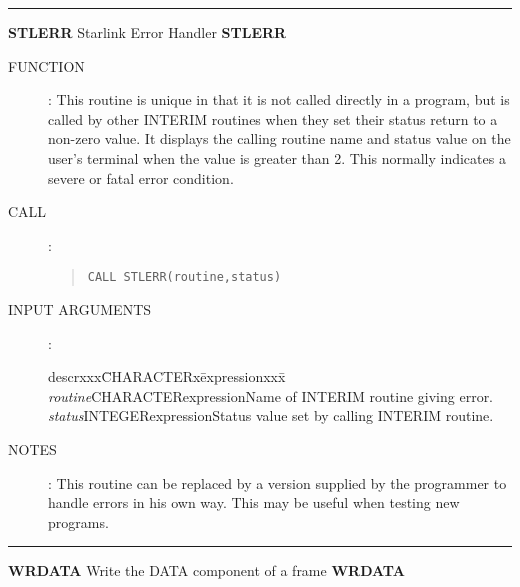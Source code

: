\documentclass{article}
\begin{document}
\rule{\textwidth}{0.3mm}
{\Large {\bf STLERR} \hfill Starlink Error Handler \hfill {\bf STLERR}}
\begin{description}
\item [FUNCTION]:
This routine is unique in that it is not called directly in a program, but is
called by other INTERIM routines when they set their status return to a
non-zero value.
It displays the calling routine name and status value on the user's terminal
when the value is greater than 2.
This normally indicates a severe or fatal error condition.
\item [CALL]:
\begin{quote}
{\tt CALL STLERR(routine,status)}
\end{quote}
\item [INPUT ARGUMENTS]:
\begin{tabbing}
descrxxx\=CHARACTERx\=expressionxxx\=\kill
{\em routine}\>CHARACTER\>expression\>Name of INTERIM routine giving error.\\
{\em status}\>INTEGER\>expression\>Status value set by calling INTERIM routine.
\end{tabbing}
\item [NOTES]:
This routine can be replaced by a version supplied by the programmer to handle
errors in his own way.
This may be useful when testing new programs.
\end{description}
\rule{\textwidth}{0.3mm}
{\Large {\bf WRDATA} \hfill Write the DATA component of a frame \hfill {\bf WRDATA}}
\end{document}
